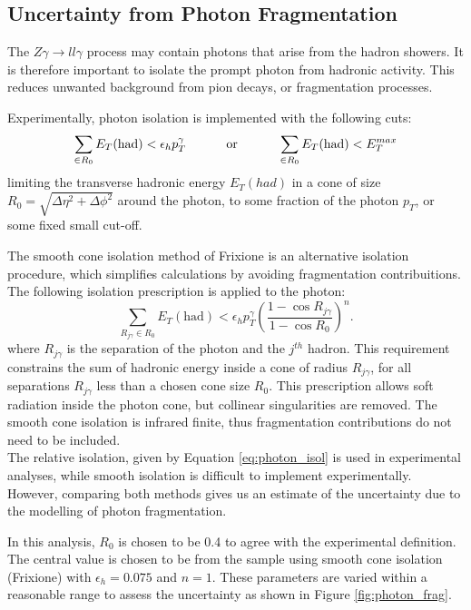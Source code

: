 \documentclass[11pt,a4paper]{report}
\newcommand{\Zg}{$Z\gamma\to ll\gamma$ }
\begin{document}
\subsection{Uncertainty from Photon Fragmentation}
The \Zg process may contain photons that arise from the hadron showers. It is therefore important to isolate the prompt photon from hadronic activity. This reduces unwanted background from pion decays, or fragmentation processes.

Experimentally, photon isolation is implemented with the following cuts:
\begin{equation}
\sum_{\in R_0} E_T(\text{had}) < \epsilon_h p_T^\gamma \text{\hspace{1cm} or \hspace{1cm}} \sum_{\in R_0} E_T(\text{had}) < E_T^{max}
\end{equation}
\label{eq:photon_isol}
limiting the transverse hadronic energy $E_T(had)$ in a cone of size $R_0 = \sqrt{\Delta\eta^2 + \Delta\phi^2}$ around the photon, to some fraction of the photon $p_T$, or some fixed small cut-off.

The smooth cone isolation method of Frixione \cite{frixione} is an alternative isolation procedure, which simplifies calculations by avoiding fragmentation contribuitions. The following isolation prescription is applied to the photon:
\begin{equation}
	\sum_{R_{j\gamma} \in R_0} E_T(\text{had}) < \epsilon_h p_T^\gamma \left(\frac{1-\cos R_{j\gamma}}{1-\cos R_0}\right)^n.
\end{equation}
\label{eq:frix_isol}
where $R_{j\gamma}$ is the separation of the photon and the $j^{th}$ hadron. This requirement constrains the sum of hadronic energy inside a cone of radius $R_{j\gamma}$, for all separations $R_{j\gamma}$ less than a chosen cone size $R_0$. This prescription allows soft radiation inside the photon cone, but collinear singularities are removed. The smooth cone isolation is infrared finite, thus fragmentation contributions do not need to be included.\\
The relative isolation, given by Equation \ref{eq:photon_isol} is used in experimental analyses, while smooth isolation is difficult to implement experimentally. However, comparing both methods gives us an estimate of the uncertainty due to the modelling of photon fragmentation.

In this analysis, $R_0$ is chosen to be 0.4 to agree with the experimental definition. The central value is chosen to be from the sample using smooth cone isolation (Frixione) with $\epsilon_h = 0.075$ and $n=1$. These parameters are varied within a reasonable range to assess the uncertainty as shown in Figure \ref{fig:photon_frag}.
\end{document}
